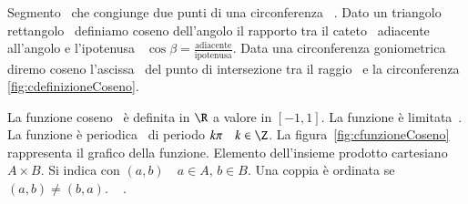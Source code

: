  Segmento\pointsto~ che congiunge due punti di una circonferenza\pointsto~ .
 Dato un triangolo rettangolo\pointsto~ definiamo coseno dell'angolo il rapporto tra il cateto\pointsto~ adiacente\pointsto~ all'angolo e l'ipotenusa\pointsto~ $\cos\beta=\frac{\text{adiacente} } {\text{ipotenusa} } $. Data una circonferenza goniometrica\pointsto~ diremo coseno l'ascissa\pointsto~ del punto di intersezione tra il raggio\pointsto~ e la circonferenza \vref*{fig:cdefinizioneCoseno}. 
\begin{figure} [b!]
	\label{fig:cfunzioneCoseno} 
	 
\end{figure} 
La funzione coseno\pointsto~ è definita in $\R$ a valore in $[-1,1]$. La funzione è limitata\pointsto~.
La funzione è periodica\pointsto~ di periodo $k\pi\quad k\in\Z$. La figura~\vref{fig:cfunzioneCoseno} rappresenta il grafico della funzione.
 Elemento dell'insieme prodotto cartesiano\pointsto~ $A\times B$. Si indica con $\left(a,b\right)\quad a\in A,\, b\in B$. Una coppia è ordinata se $\left(a,b\right)\neq\left(b,a\right)$. 
 \pointsto~ .
\begin{figure} 
	\label{fig:cdefinizioneCoseno} 
	 
\end{figure} 